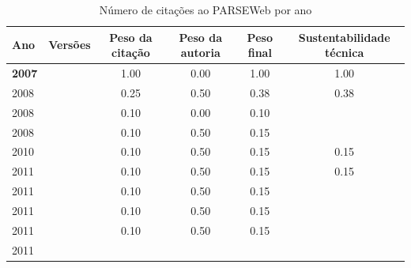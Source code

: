 \begin{table}[H]
\caption{Número de citações ao PARSEWeb por ano}
\centering
\begin{tabular}{| l | c | c | c | c | c |}
  \hline
  Ano & Versões & Peso da citação & Peso da autoria & Peso final & Sustentabilidade técnica \\
  \hline
            {\bf 2007}
          &
          
          &
          1.00
          &
          0.00
          &
          1.00
          &
            {\color{blue} 1.00}
          \\
\hline
            2008
          &
          
          &
          0.25
          &
          0.50
          &
          0.38
          &
            {\color{red} 0.38}
          \\
            2008
          &
          
          &
          0.10
          &
          0.00
          &
          0.10
          &
          \\
            2008
          &
          
          &
          0.10
          &
          0.50
          &
          0.15
          &
          \\
\hline
            2010
          &
          
          &
          0.10
          &
          0.50
          &
          0.15
          &
            {\color{red} 0.15}
          \\
\hline
            2011
          &
          
          &
          0.10
          &
          0.50
          &
          0.15
          &
            {\color{red} 0.15}
          \\
            2011
          &
          
          &
          0.10
          &
          0.50
          &
          0.15
          &
          \\
            2011
          &
          
          &
          0.10
          &
          0.50
          &
          0.15
          &
          \\
            2011
          &
          
          &
          0.10
          &
          0.50
          &
          0.15
          &
          \\
            2011
          &
          

\end{tabular}
\end{table}

